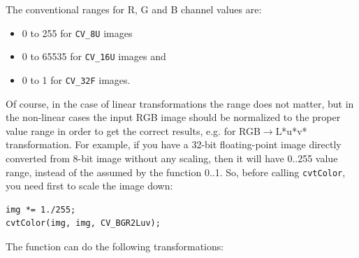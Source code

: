 The conventional ranges for R, G and B channel values are:

\begin{itemize}
 \item 0 to 255 for \texttt{CV\_8U} images
 \item 0 to 65535 for \texttt{CV\_16U} images and
 \item 0 to 1 for \texttt{CV\_32F} images.
\end{itemize}

Of course, in the case of linear transformations the range does not matter,
but in the non-linear cases the input RGB image should be normalized to the proper value range in order to get the correct results, e.g. for RGB$\rightarrow$L*u*v* transformation. For example, if you have a 32-bit floating-point image directly converted from 8-bit image without any scaling, then it will have 0..255 value range, instead of the assumed by the function 0..1. So, before calling \texttt{cvtColor}, you need first to scale the image down:
\begin{lstlisting}
img *= 1./255;
cvtColor(img, img, CV_BGR2Luv);
\end{lstlisting}

The function can do the following transformations:

